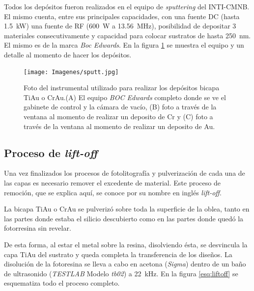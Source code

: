 		  	Todos los depósitos fueron realizados en el equipo de \textit{sputtering} del INTI-CMNB. El mismo cuenta, entre sus principales capacidades, con una fuente DC (hasta \SI{1.5}{\kW}) una fuente de RF (\SI{600}{W} a \SI{13.56}{\MHz}), posibilidad de depositar 3 materiales consecutivamente y capacidad para colocar sustratos de hasta \SI{250}{\nm}. El mismo es de la marca \textit{Boc Edwards}. En la figura \ref{fig:sputt} se muestra el equipo y un detalle al momento de hacer los depósitos.


		   		  \begin{figure}[h!]
				  \begin{center}
				  \texttt{[image: Imagenes/sputt.jpg]}
				  \caption[Equipo para depósito de películas delgadas, \textit{sputtering}]{Foto del instrumental utilizado para realizar los depósitos bicapa Ti\textbar Au o Cr\textbar Au.(A) El equipo \textit{BOC Edwards} completo donde se ve el gabinete de control y la cámara de vacío, (B) foto a través de la ventana al momento de realizar un deposito de Cr y (C) foto a través de la ventana al momento de realizar un deposito de Au.}
				  \label{fig:sputt}
				  \end{center}
				  \end{figure}

	\subsection{Proceso de\textit{ lift-off}}\label{sec:liffff}

   	     Una vez finalizados los procesos de fotolitografía y pulverización de cada una de las capas es necesario remover el excedente de material. Este proceso de remoción, que se explica aquí, se conoce por su nombre en inglés \textit{lift-off}.

		 La bicapa Ti\textbar Au o Cr\textbar Au se pulverizó sobre toda la superficie de la oblea, tanto en las partes donde estaba el silicio descubierto como en las partes donde quedó la fotorresina sin revelar. 
		
		 De esta forma, al estar el metal sobre la resina, disolviendo ésta, se desvincula la capa Ti\textbar Au del sustrato y queda completa la transferencia de los diseños. 
		 La disolución de la fotoresina se lleva a cabo en acetona (\textit{Sigma}) dentro de un baño de ultrasonido (\textit{TESTLAB} Modelo \textit{tb02}) a \SI{22}{\kHz}. En la figura \ref{esq:liftoff} se esquematiza todo el proceso completo.\vspace*{-5mm}

